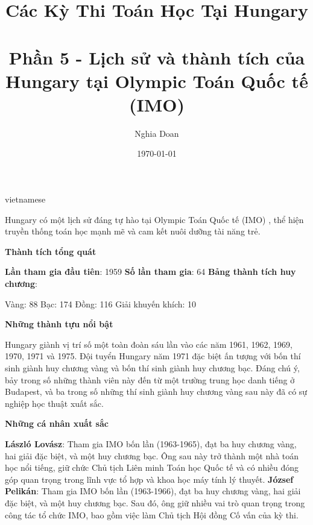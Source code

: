 \documentclass{article}
\title{Các Kỳ Thi Toán Học Tại Hungary\\ \quad \\Phần 5 - Lịch sử và thành tích của Hungary tại Olympic Toán Quốc tế (IMO)}
\author{Nghia Doan}
\date{\today}
\begin{document}
\begin{otherlanguage*}{vietnamese}

\maketitle

Hungary có một lịch sử đáng tự hào tại Olympic Toán Quốc tế (IMO) \cite{IMO_team}, thể hiện truyền thống toán học mạnh mẽ và cam kết nuôi dưỡng tài năng trẻ.

\textbf{Thành tích tổng quát}

\begin{itemize}[topsep=0pt, partopsep=0pt, itemsep=0pt]
    \ii \textbf{Lần tham gia đầu tiên}: 1959
    \ii \textbf{Số lần tham gia}: 64
    \ii \textbf{Bảng thành tích huy chương}:
    \begin{itemize}[topsep=0pt, partopsep=0pt, itemsep=0pt]
        \ii Vàng: 88
        \ii Bạc: 174
        \ii Đồng: 116
        \ii Giải khuyến khích: 10
    \end{itemize}
\end{itemize}

\textbf{Những thành tựu nổi bật}
\begin{itemize}[topsep=0pt, partopsep=0pt, itemsep=0pt]
    \ii Hungary giành vị trí số một toàn đoàn sáu lần vào các năm 1961, 1962, 1969, 1970, 1971 và 1975.
    \ii Đội tuyển Hungary năm 1971 đặc biệt ấn tượng với bốn thí sinh giành huy chương vàng và bốn thí sinh giành huy chương bạc.
    Đáng chú ý, bảy trong số những thành viên này đến từ một trường trung học danh tiếng ở Budapest, và ba trong số những thí sinh giành huy chương vàng sau này đã có sự nghiệp học thuật xuất sắc.
\end{itemize}

\textbf{Những cá nhân xuất sắc}

\begin{itemize}[topsep=0pt, partopsep=0pt, itemsep=0pt]
    \ii \textbf{László Lovász}: Tham gia IMO bốn lần (1963-1965), đạt ba huy chương vàng, hai giải đặc biệt, và một huy chương bạc. 
    Ông sau này trở thành một nhà toán học nổi tiếng, giữ chức Chủ tịch Liên minh Toán học Quốc tế và có nhiều đóng góp quan trọng trong lĩnh vực tổ hợp và khoa học máy tính lý thuyết.
    \ii \textbf{József Pelikán}: Tham gia IMO bốn lần (1963-1966), đạt ba huy chương vàng, hai giải đặc biệt, và một huy chương bạc.  
    Sau đó, ông giữ nhiều vai trò quan trọng trong công tác tổ chức IMO, bao gồm việc làm Chủ tịch Hội đồng Cố vấn của kỳ thi.
\end{itemize}


\end{otherlanguage*}
\end{document}
